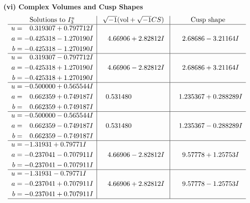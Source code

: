 \documentclass[1p]{elsarticle_modified}
\theoremstyle{definition}
\newcommand{\I}{\sqrt{-1}}
\begin{document}
\newpage\flushleft \textbf{(vi) Complex Volumes and Cusp Shapes}
$$\begin{array}{c|c|c}  
\text{Solutions to }I^u_{3}& \I (\text{vol} + \sqrt{-1}CS) & \text{Cusp shape}\\
 \hline 
\begin{aligned}
u &= \phantom{-}0.319307 + 0.797712 I \\
a &= -0.425318 - 1.270190 I \\
b &= -0.425318 - 1.270190 I\end{aligned}
 & \phantom{-}4.66906 + 2.82812 I & \phantom{-}2.68686 - 3.21164 I \\ \hline\begin{aligned}
u &= \phantom{-}0.319307 - 0.797712 I \\
a &= -0.425318 + 1.270190 I \\
b &= -0.425318 + 1.270190 I\end{aligned}
 & \phantom{-}4.66906 - 2.82812 I & \phantom{-}2.68686 + 3.21164 I \\ \hline\begin{aligned}
u &= -0.500000 + 0.565544 I \\
a &= \phantom{-}0.662359 + 0.749187 I \\
b &= \phantom{-}0.662359 + 0.749187 I\end{aligned}
 & \phantom{-}0.531480\phantom{ +0.000000I} & \phantom{-}1.235367 + 0.288289 I \\ \hline\begin{aligned}
u &= -0.500000 - 0.565544 I \\
a &= \phantom{-}0.662359 - 0.749187 I \\
b &= \phantom{-}0.662359 - 0.749187 I\end{aligned}
 & \phantom{-}0.531480\phantom{ +0.000000I} & \phantom{-}1.235367 - 0.288289 I \\ \hline\begin{aligned}
u &= -1.31931 + 0.79771 I \\
a &= -0.237041 - 0.707911 I \\
b &= -0.237041 - 0.707911 I\end{aligned}
 & \phantom{-}4.66906 - 2.82812 I & \phantom{-}9.57778 + 1.25753 I \\ \hline\begin{aligned}
u &= -1.31931 - 0.79771 I \\
a &= -0.237041 + 0.707911 I \\
b &= -0.237041 + 0.707911 I\end{aligned}
 & \phantom{-}4.66906 + 2.82812 I & \phantom{-}9.57778 - 1.25753 I\\
 \hline 
 \end{array}$$\newpage
\end{document}
